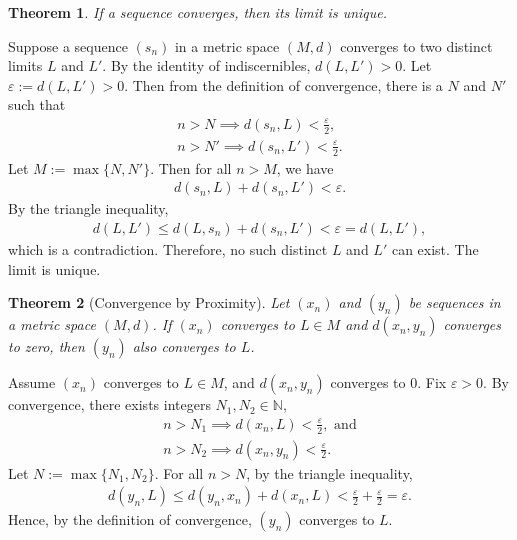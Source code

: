 \documentclass{amsart}
\numberwithin{equation}{section}
\let\oldendproof\endproof
\renewenvironment{proof}[1][\proofname]{%
  \setcounter{case}{0}
  \setcounter{step}{0}
  \oldproof[#1]%
}{\oldendproof}
\theoremstyle{plain}
\newtheorem{theorem}{Theorem}[section]
\theoremstyle{definition}
\theoremstyle{remark}
\begin{document}
\begin{theorem}
  If a sequence converges, then its limit is unique.
\end{theorem}
\begin{proof}
  Suppose a sequence $(s_n)$ in a metric space $(M, d)$ converges to two distinct limits $L$ and $L'$.
  By the identity of indiscernibles, $d(L, L')>0$.
  Let $\varepsilon:=d(L,L')>0$.
  Then from the definition of convergence, there is a $N$ and $N'$ such that
  \begin{align*}
    n > N \implies d(s_n, L) < \frac{\varepsilon}{2}, \\
    n > N' \implies d(s_n, L') < \frac{\varepsilon}{2}.
  \end{align*}
  Let $M:= \max\{N, N'\}$. Then for all $n>M$, we have
  \begin{align*}
    d(s_n, L) + d(s_n, L') < \varepsilon.
  \end{align*}
  By the triangle inequality,
  \begin{align*}
     d(L, L') \leq d(L, s_n) + d(s_n, L') < \varepsilon = d(L, L'),
  \end{align*}
  which is a contradiction.
  Therefore, no such distinct $L$ and $L'$ can exist. The limit is unique.
\end{proof}


\begin{theorem}[Convergence by Proximity]
  Let $(x_n)$ and $(y_n)$ be sequences in a metric space $(M, d)$.
  If $(x_n)$ converges to $L \in M$ and $d(x_n, y_n)$ converges to zero, then $(y_n)$ also converges to $L$.
\end{theorem}
\begin{proof}
  Assume $(x_n)$ converges to $L \in M$, and $d(x_n, y_n)$ converges to $0$.
  Fix $\varepsilon > 0$.
  By convergence, there exists integers $N_1, N_2\in\mathbb{N}$,
  \begin{align*}
    n > N_1 \implies d(x_n, L) < \frac{\varepsilon}{2},\text{ and}\\
    n > N_2 \implies d(x_n, y_n) < \frac{\varepsilon}{2}.
  \end{align*}
  Let $N:= \max\{N_1, N_2\}$.
  For all $n > N$, by the triangle inequality,
  \begin{align*}
    d(y_n, L) \leq d(y_n, x_n) + d(x_n, L) < \frac{\varepsilon}{2} + \frac{\varepsilon}{2} = \varepsilon.
  \end{align*}
  Hence, by the definition of convergence, $(y_n)$ converges to $L$.
\end{proof}
\end{document}
